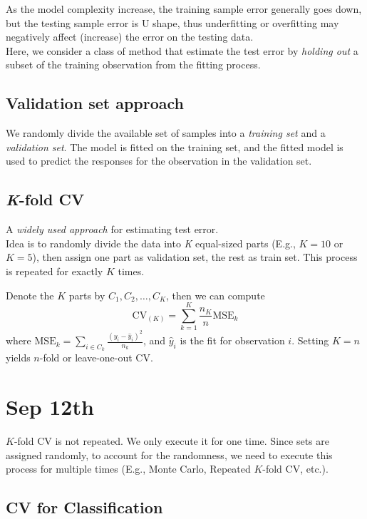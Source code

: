 \documentclass{article}
\begin{document}
As the model complexity increase, the training sample error generally goes down, but the testing sample error is U shape, thus underfitting or overfitting may negatively affect (increase) the error on the testing data.\\

Here, we consider a class of method that estimate the test error by \textit{holding out} a subset of the training observation from the fitting process.

\subsection{Validation set approach}

We randomly divide the available set of samples into a \textit{training set} and a \textit{validation set}. The model is fitted on the training set, and the fitted model is used to predict the responses for the observation in the validation set.

\subsection{\textit{K}-fold CV}

A \textit{widely used approach} for estimating test error.\\

Idea is to randomly divide the data into \textit{K} equal-sized parts (E.g., $K = 10$ or $K = 5$), then assign one part as validation set, the rest as train set. This process is repeated for exactly $K$ times.

Denote the $K$ parts by $C_1, C_2, \dots, C_K$, then we can compute $$\mathrm{CV}_{(K)} = \sum_{k=1}^K \frac{n_K}{n}\mathrm{MSE}_k$$ where $\displaystyle \mathrm{MSE}_k = \sum_{i\in C_k}\frac{(y_i - \hat{y}_i)^2}{n_k}$, and $\hat{y}_i$ is the fit for observation $i$. Setting $K = n$ yields $n$-fold or leave-one-out CV.


\section{Sep 12th}

$K$-fold CV is not repeated. We only execute it for one time. Since sets are assigned randomly, to account for the randomness, we need to execute this process for multiple times (E.g., Monte Carlo, Repeated $K$-fold CV, etc.).

\subsection{CV for Classification}
\end{document}
